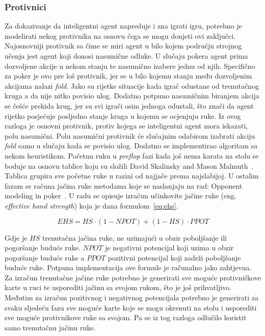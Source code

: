 \subsubsection{Protivnici}
Za dokazivanje da inteligentni agent napreduje i zna igrati igru, potrebno je modelirati nekog protivnika na osnovu čega se mogu donjeti ovi zaključci. Najosnovniji protivnik sa čime se miri agent u bilo kojem području strojnog učenja jest agent koji donosi nasumične odluke. U slučaju pokera agent prima dozvoljene akcije u nekom stanju te nasumično izabere jednu od njih. Specifično za poker je ovo pre loš protivnik, jer se u bilo kojemu stanju među dozvoljenim akcijama nalazi \textit{fold}. Jako su rijetke situacije kada igrač odustane od trenutačnog kruga a da nije nitko povisio ulog. Dodatno potpuno nasumičnim biranjem akcija se češće prekida krug, jer su svi igrači osim jednoga odustali, što znači da agent rijetko posjećuje posljedno stanje kruga u kojemu se ocjenjuju ruke. Iz ovog razloga je osnovni protivnik, protiv kojega se inteligentni agent mora iskazati, polu nasumični. Polu nasumični protivnik će slučajnim odabirom izabrati akciju \textit{fold} samo u slučaju kada se povisio ulog. Dodatno se implementirao algoritam sa nekom heuristikom. Početnu ruku u \textit{preflop} fazi kada još nema karata na stolu se boduje na osnovu tablice koju su složili David Skalinsky and Mason Malmuth~\cite{starting_hand_groups}. Tablica grupira sve početne ruke u razini od najjače prema najslabijoj. U ostalim fazam se računa jačina ruke metodama koje se naslanjaju na rad: Opponent modeling in poker~\cite{EHS}. U radu se opisuje izračun učinkovite jačine ruke (eng. \textit{effective hand strength}) koja je dana formulom~\ref{eq:ehs}.

\begin{equation}\label{eq:ehs}
EHS = HS \cdot (1 - NPOT) + (1 - HS) \cdot PPOT
\end{equation}

Gdje je $HS$ trenutačna jačina ruke, ne uzimajući u obzir poboljšanje ili pogoršanje buduće ruke. $NPOT$ je negativni potencijal koji uzima u obzir pogoršanje buduće ruke a $PPOT$ pozitivni potencijal koji zadrži poboljšanje buduće ruke. Potpuna implementacija ove formule je računalno jako zahtjevna. Za izračun trenutačne jačine ruke potrebno je generirati sve moguće protivničkove karte u ruci te usporediti jačinu sa svojom rukom, što je još prihvatljivo. Međutim za izračun pozitivnog i negativnog potencijala potrebno je generirati za svaku sljedeću fazu sve moguće karte koje se mogu okrenuti na stolu i usporediti sve moguće protivnikove ruke sa svojom. Pa se iz tog razloga odlučilo koristit samo trenutačnu jačinu ruke.

